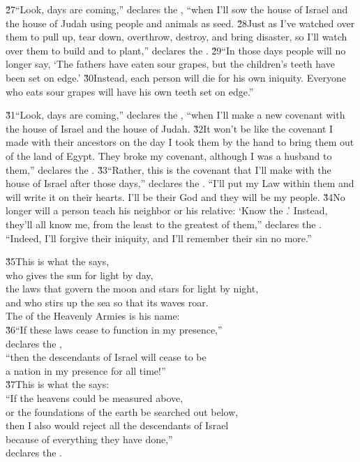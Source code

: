 \v{27}``Look, days are coming,'' declares the , ``when I'll sow the house of Israel and the house of Judah using people and animals as seed. \v{28}Just as I've watched over them to pull up, tear down, overthrow, destroy, and bring disaster, so I'll watch over them to build and to plant,'' declares the . \v{29}``In those days people will no longer say, `The fathers have eaten sour grapes, but the children's teeth have been set on edge.' \v{30}Instead, each person will die for his own iniquity. Everyone who eats sour grapes will have his own teeth set on edge.''

\v{31}``Look, days are coming,'' declares the , ``when I'll make a new covenant with the house of Israel and the house of Judah. \v{32}It won't be like the covenant I made with their ancestors on the day I took them by the hand to bring them out of the land of Egypt. They broke my covenant, although I was a husband to them,'' declares the . \v{33}``Rather, this is the covenant that I'll make with the house of Israel after those days,'' declares the . ``I'll put my Law within them and will write it on their hearts. I'll be their God and they will be my people. \v{34}No longer will a person teach his neighbor or his relative: `Know the .' Instead, they'll all know me, from the least to the greatest of them,'' declares the . ``Indeed, I'll forgive their iniquity, and I'll remember their sin no more.''

\begin{poetry}
\poeml \v{35}This is what the  says, \\
\poemll    who gives the sun for light by day, \\
\poeml the laws that govern the moon and stars for light by night, \\
\poemll    and who stirs up the sea so that its waves roar. \\
\poemlll       The  of the Heavenly Armies is his name: \\
\poeml \v{36}``If these laws cease to function in my presence,'' \\
\poemll    declares the , \\
\poeml ``then the descendants of Israel will cease to be \\
\poemll    a nation in my presence for all time!'' \\
\poeml \v{37}This is what the  says: \\
\poeml ``If the heavens could be measured above, \\
\poemll    or the foundations of the earth be searched out below, \\
\poeml then I also would reject all the descendants of Israel \\
\poemll    because of everything they have done,'' \\
\poemlll       declares the .
\end{poetry}

